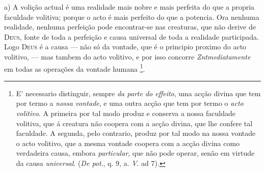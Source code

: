 a) A volição actual é uma realidade mais nobre e mais perfeita do que a propria faculdade volitiva; porque o acto é   mais perfeito do que a potencia. Ora nenhuma realidade, nenhuma perfeição pode encontrar-se nas creaturas, que não derive de \textsc{Deus}, fonte de toda a perfeição e causa universal de toda a realidade participada. Logo \textsc{Deus} é a causa --- não   só da vontade, que é o principio proximo do acto volitivo, --- mas tambem do acto volitivo, e por isso concorre \emph{Zntmediatamente} em todas as operações da vontade humana \footnote{E' necessario distinguir, sempre \emph{da parte do effeito}, uma acção divina que tem por termo a \emph{nossa vontade}, e uma outra acção que tem por termo o \emph{acto volitivo}. A primeira por tal modo produz e conserva a nossa faculdade volitiva, que á creatura não coopera com a acção divina, que lhe confere tal faculdade. A segunda, pelo contrario, produz por tal modo na nossa vontade o acto volitivo, que a mesma vontade coopera com a acção divina como verdadeira causa, embora \emph{particular}, que não pode operar, senão em virtude da causa \emph{universal}. (\emph{De pot}., q. 9, a. \emph{V}. ad 7).}.

